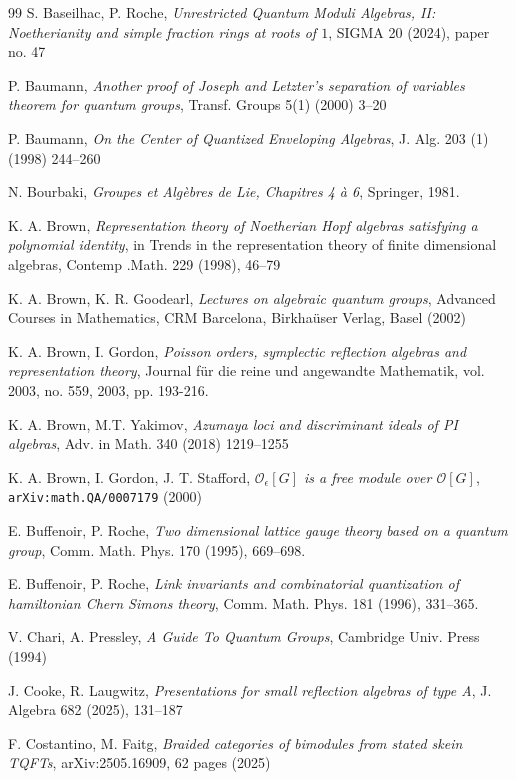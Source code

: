 \documentclass[11pt]{amsart}
\newcommand{\e}{\epsilon}
\newcommand{\Oo}{\mathcal{O}}
\begin{document}
\begin{thebibliography}{99}
 S. Baseilhac, P. Roche, {\em Unrestricted Quantum Moduli Algebras, II: Noetherianity and simple fraction rings at roots of $1$}, SIGMA 20 (2024), paper no. 47

 P. Baumann, {\em Another proof of Joseph and Letzter’s separation of variables theorem for quantum groups}, Transf. Groups 5(1) (2000) 3--20

 P. Baumann, {\em On the Center of Quantized Enveloping Algebras}, J. Alg. 203 (1) (1998) 244--260

 N. Bourbaki, {\em Groupes et Alg\`ebres de Lie, Chapitres 4 \`a 6}, Springer, 1981.

 K. A. Brown, {\it Representation theory of  Noetherian Hopf algebras satisfying a polynomial identity}, in Trends in the representation theory of finite dimensional algebras, Contemp .Math. 229 (1998), 46--79

 K. A. Brown, K. R. Goodearl, {\it Lectures on algebraic quantum groups},  Advanced Courses in Mathematics, CRM Barcelona, Birkha\"user Verlag, Basel (2002)

 K. A. Brown, I. Gordon, {\it Poisson orders, symplectic reflection algebras and representation theory}, Journal für die reine und angewandte Mathematik, vol. 2003, no. 559, 2003, pp. 193-216.

 K. A. Brown, M.T. Yakimov, {\it Azumaya loci and discriminant ideals of PI algebras}, Adv. in Math. 340 (2018) 1219--1255

 K. A. Brown, I. Gordon, J. T. Stafford, {\it $\Oo_\e[G]$ is a free module over $\Oo[G]$}, {\tt  arXiv:math.QA/0007179} (2000)

 E. Buffenoir, P. Roche, {\it Two dimensional lattice gauge theory based on a quantum group}, Comm. Math. Phys. 170 (1995), 669--698.

 E. Buffenoir, P. Roche, {\em Link invariants and combinatorial quantization of hamiltonian Chern Simons theory}, Comm. Math. Phys. 181 (1996), 331--365.

 V. Chari, A. Pressley, {\it A Guide To Quantum Groups}, Cambridge Univ. Press (1994)

 J. Cooke, R. Laugwitz, {\it Presentations for small reflection algebras of type A}, J. Algebra 682 (2025), 131--187

 F. Costantino, M. Faitg, {\em Braided categories of bimodules from stated skein TQFTs}, arXiv:2505.16909, 62 pages (2025)


\end{thebibliography}
\end{document}
